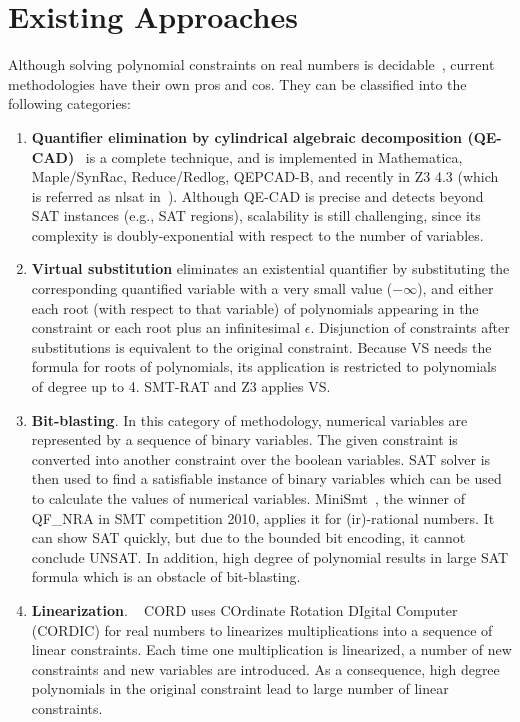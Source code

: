 \section{Existing Approaches}
Although solving polynomial constraints on real numbers is decidable~\cite{tarski}, current methodologies have their own pros and cos. They can be classified into the following categories: 
\begin{enumerate}
\item \textbf{Quantifier elimination by cylindrical algebraic decomposition (QE-CAD)}~\cite{qecad} 
is a complete technique, and 
is implemented in Mathematica, Maple/SynRac, Reduce/Redlog, QEPCAD-B, and recently 
in
Z3 4.3 (which is referred as nlsat in~\cite{Jovanovic13}).
Although QE-CAD is precise and detects beyond SAT instances (e.g., SAT regions), 
scalability is still challenging, since its complexity is doubly-exponential with respect to the number of variables. 

\item \textbf{Virtual substitution } eliminates an existential quantifier by substituting the corresponding quantified variable with a very small value ($-\infty$), and either each root (with respect to that variable) of polynomials appearing in the constraint or each root plus an infinitesimal $\epsilon$. Disjunction of constraints after substitutions is equivalent to the original constraint. Because VS needs the formula for roots of polynomials, its application is restricted to polynomials of degree up to 4. SMT-RAT and  
Z3 \cite{PBM12} applies VS.

\item \textbf{Bit-blasting}. 
In this category of methodology, numerical variables are represented by a sequence of binary variables. The given constraint is converted into another constraint over the boolean variables. SAT solver is then used to find a satisfiable instance of binary variables which can be used to calculate the values of numerical variables.  MiniSmt~\cite{Zankl:2010:SNR:1939141.1939168}, the winner of QF\_NRA in SMT competition 2010, 
applies it for (ir)-rational numbers.
It can show SAT quickly, but due to the bounded bit encoding, 
it cannot conclude UNSAT. In addition, high degree of polynomial results in large SAT formula which is an obstacle of bit-blasting.

\item \textbf{Linearization}. ~
CORD \cite{cordic} uses COrdinate Rotation DIgital Computer (CORDIC) for real numbers to linearizes multiplications into a sequence of linear constraints. Each time one multiplication is linearized, a number of new constraints and new variables are introduced. As a consequence, high degree polynomials in the original constraint lead to large number of linear constraints. 


\end{enumerate}
